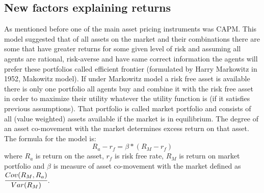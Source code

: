 \documentclass[a4paper,12pt]{article} %
\begin{document}
	\subsection{New factors explaining returns}
	As mentioned before one of the main asset pricing instruments was CAPM. This model suggested that of all assets on the market and their combinations there are some that have greater returns for some given level of risk and assuming all agents are rational, risk-averse and have same correct information the agents will prefer these portfolios called efficient frontier (formulated by Harry Markowitz in 1952\cite{selection1952harry}, Makowitz model). If under Markowitz model a risk free asset is available there is only one portfolio all agents buy and combine it with the risk free asset in order to maximize their utility whatever the utility function is (if it satisfies previous assumptions). That portfolio is called market portfolio and consists of all (value weighted) assets available if the market is in equilibrium. The degree of an asset co-movement with the market determines excess return on that asset. The formula for the model is:
	\[R_a - r_f = \beta * (R_M - r_f)\]
	where $R_a$ is return on the asset, $r_f$ is risk free rate, $R_M$ is return on market portfolio and $\beta$ is measure of asset co-movement with the market defined as $\cfrac{Cov(R_M, R_a)}{Var(R_M)}$.
\end{document}
